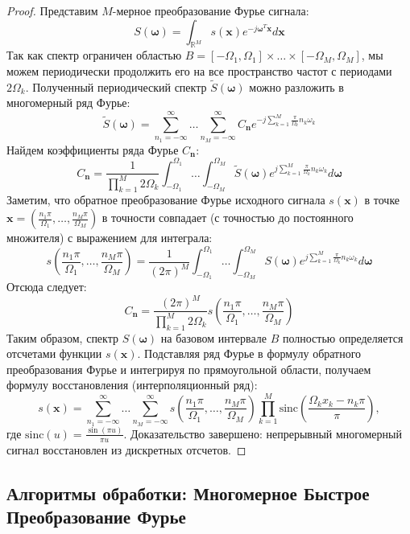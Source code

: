 \documentclass[12pt,a4paper]{article}
\begin{document}
\begin{proof}
Представим $M$-мерное преобразование Фурье сигнала:
$$ S(\boldsymbol{\omega}) = \int_{\mathbb{R}^M} s(\mathbf{x}) e^{-j \boldsymbol{\omega}^T \mathbf{x}} d\mathbf{x} $$
Так как спектр ограничен областью $B = [-\Omega_1, \Omega_1] \times \dots \times [-\Omega_M, \Omega_M]$, мы можем периодически продолжить его на все пространство частот с периодами $2\Omega_k$. Полученный периодический спектр $\tilde{S}(\boldsymbol{\omega})$ можно разложить в многомерный ряд Фурье:
$$ \tilde{S}(\boldsymbol{\omega}) = \sum_{n_1=-\infty}^{\infty} \dots \sum_{n_M=-\infty}^{\infty} C_{\mathbf{n}} e^{-j \sum_{k=1}^M \frac{\pi}{\Omega_k} n_k \omega_k} $$
Найдем коэффициенты ряда Фурье $C_{\mathbf{n}}$:
$$ C_{\mathbf{n}} = \frac{1}{\prod_{k=1}^M 2\Omega_k} \int_{-\Omega_1}^{\Omega_1} \dots \int_{-\Omega_M}^{\Omega_M} \tilde{S}(\boldsymbol{\omega}) e^{j \sum_{k=1}^M \frac{\pi}{\Omega_k} n_k \omega_k} d\boldsymbol{\omega} $$
Заметим, что обратное преобразование Фурье исходного сигнала $s(\mathbf{x})$ в точке $\mathbf{x} = \left(\frac{n_1 \pi}{\Omega_1}, \dots, \frac{n_M \pi}{\Omega_M}\right)$ в точности совпадает (с точностью до постоянного множителя) с выражением для интеграла:
$$ s\left(\frac{n_1 \pi}{\Omega_1}, \dots, \frac{n_M \pi}{\Omega_M}\right) = \frac{1}{(2\pi)^M} \int_{-\Omega_1}^{\Omega_1} \dots \int_{-\Omega_M}^{\Omega_M} S(\boldsymbol{\omega}) e^{j \sum_{k=1}^M \frac{\pi}{\Omega_k} n_k \omega_k} d\boldsymbol{\omega} $$
Отсюда следует:
$$ C_{\mathbf{n}} = \frac{(2\pi)^M}{\prod_{k=1}^M 2\Omega_k} s\left(\frac{n_1 \pi}{\Omega_1}, \dots, \frac{n_M \pi}{\Omega_M}\right) $$
Таким образом, спектр $S(\boldsymbol{\omega})$ на базовом интервале $B$ полностью определяется отсчетами функции $s(\mathbf{x})$. Подставляя ряд Фурье в формулу обратного преобразования Фурье и интегрируя по прямоугольной области, получаем формулу восстановления (интерполяционный ряд):
$$ s(\mathbf{x}) = \sum_{n_1=-\infty}^{\infty} \dots \sum_{n_M=-\infty}^{\infty} s\left(\frac{n_1 \pi}{\Omega_1}, \dots, \frac{n_M \pi}{\Omega_M}\right) \prod_{k=1}^M \text{sinc}\left(\frac{\Omega_k x_k - n_k \pi}{\pi}\right), $$
где $\text{sinc}(u) = \frac{\sin(\pi u)}{\pi u}$.
Доказательство завершено: непрерывный многомерный сигнал восстановлен из дискретных отсчетов.
\end{proof}

\subsection{Алгоритмы обработки: Многомерное Быстрое Преобразование Фурье}
\end{document}
